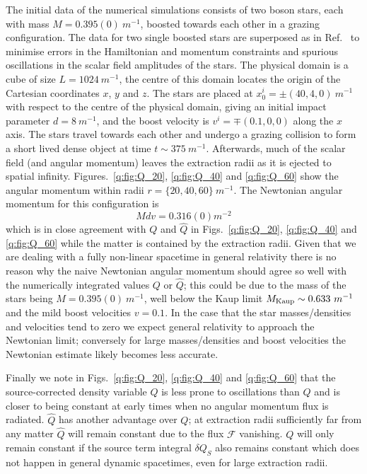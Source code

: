 The initial data of the numerical simulations consists of two boson stars, each with mass $M=0.395(0)~m^{-1}$, boosted towards each other in a grazing configuration. The data for two single boosted stars are superposed as in Ref.~\cite{helfer2021malaise} to minimise errors in the Hamiltonian and momentum constraints and spurious oscillations in the scalar field amplitudes of the stars.
The physical domain is a cube of size $L=1024 ~m^{-1}$, the centre of this domain locates the origin of the Cartesian coordinates $x$, $y$ and $z$. The stars are placed at $x_0^i=\pm(40,4,0)~m^{-1}$ with respect to the centre of the physical domain, giving an initial impact parameter $d=8~m^{-1}$, and the boost velocity is $v^i=\mp(0.1,0,0)$ along the $x$ axis. The stars travel towards each other and undergo a grazing collision to form a short lived dense object at time $t \sim 375 ~m^{-1}$. Afterwards, much of the scalar field (and angular momentum) leaves the extraction radii as it is ejected to spatial infinity. Figures.~\ref{q:fig:Q_20}, \ref{q:fig:Q_40} and \ref{q:fig:Q_60} show the angular momentum within radii $r = \{20,40,60\}~m^{-1}$. The Newtonian angular momentum for this configuration is
\begin{equation}\label{q:eq:newtQ}Mdv=0.316(0) m^{-2}\end{equation}
 which is in close agreement with $Q$ and $\hat{Q}$ in Figs.~\ref{q:fig:Q_20}, \ref{q:fig:Q_40} and \ref{q:fig:Q_60} while the matter is contained by the extraction radii. Given that we are dealing with a fully non-linear spacetime in general relativity there is no reason why the naive Newtonian angular momentum should agree so well with the numerically integrated values $Q$ or $\hat{Q}$; this could be due to the mass of the stars being $M=0.395(0) ~m^{-1}$, well below the Kaup limit $M_{\rm{Kaup}} \sim 0.633 ~m^{-1}$ and the mild boost velocities $v=0.1$. In the case that the star masses/densities and velocities tend to zero we expect general relativity to approach the Newtonian limit; conversely for large masses/densities and boost velocities the Newtonian estimate likely becomes less accurate.

 Finally we note in Figs.~\ref{q:fig:Q_20}, \ref{q:fig:Q_40} and \ref{q:fig:Q_60} that the source-corrected density variable $\hat{Q}$ is less prone to oscillations than $Q$ and is closer to being constant at early times when no angular momentum flux is radiated. $\hat{Q}$ has another advantage over $Q$; at extraction radii sufficiently far from any matter $\hat{Q}$ will remain constant due to the flux $\mathcal{F}$ vanishing. $Q$ will only remain constant if the source term integral $\delta Q_S$ also remains constant which does not happen in general dynamic spacetimes, even for large extraction radii.






